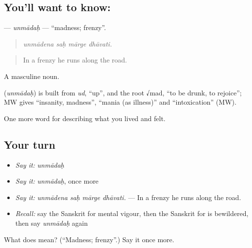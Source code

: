 \subsection*{You'll want to know: }
\textbf{} — \emph{unmādaḥ} — \textquotedblleft{}madness; frenzy\textquotedblright{}.

\begin{quote}
   
\end{quote}

\begin{quote}
\emph{unmādena saḥ mārge dhāvati.}
\end{quote}

\begin{quote}
In a frenzy he runs along the road.
\end{quote}

A masculine noun.

\begin{cousinweb}
\textbf{} (\emph{unmādaḥ}) is built from \emph{ud}, \textquotedblleft{}up\textquotedblright{}, and the root √mad, \textquotedblleft{}to be drunk, to rejoice\textquotedblright{}; MW gives \textquotedblleft{}insanity, madness\textquotedblright{}, \textquotedblleft{}mania (as illness)\textquotedblright{} and \textquotedblleft{}intoxication\textquotedblright{} (MW).
\end{cousinweb}

\begin{grammarlens}[title={What you've built}]
One more word for describing what you lived and felt.
\end{grammarlens}

\subsection*{Your turn}
\begin{itemize}
\raggedright
  \item \emph{Say it:} \emph{unmādaḥ}
  \item \emph{Say it:} \emph{unmādaḥ}, once more
  \item \emph{Say it:} \emph{unmādena saḥ mārge dhāvati.} — In a frenzy he runs along the road.
  \item \emph{Recall:} say the Sanskrit for mental vigour, then the Sanskrit for is bewildered, then say \emph{unmādaḥ} again
\end{itemize}

\begin{tcolorbox}[breakable,colback=teal!4,colframe=teal!35!black,title={Before you move on}]
What does  mean? (\textquotedblleft{}Madness; frenzy\textquotedblright{}.) Say it once more.
\end{tcolorbox}
